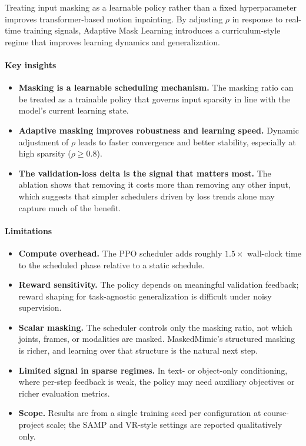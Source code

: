 \documentclass[10pt,letterpaper]{article}
\begin{document}
Treating input masking as a learnable policy rather than a fixed hyperparameter improves transformer-based motion inpainting. By adjusting $\rho$ in response to real-time training signals, Adaptive Mask Learning introduces a curriculum-style regime that improves learning dynamics and generalization.

\paragraph{Key insights}
\begin{itemize}
  \item \textbf{Masking is a learnable scheduling mechanism.} The masking ratio can be treated as a trainable policy that governs input sparsity in line with the model's current learning state.
  \item \textbf{Adaptive masking improves robustness and learning speed.} Dynamic adjustment of $\rho$ leads to faster convergence and better stability, especially at high sparsity ($\rho \ge 0.8$).
  \item \textbf{The validation-loss delta is the signal that matters most.} The ablation shows that removing it costs more than removing any other input, which suggests that simpler schedulers driven by loss trends alone may capture much of the benefit.
\end{itemize}

\paragraph{Limitations}
\begin{itemize}
  \item \textbf{Compute overhead.} The PPO scheduler adds roughly $1.5\times$ wall-clock time to the scheduled phase relative to a static schedule.
  \item \textbf{Reward sensitivity.} The policy depends on meaningful validation feedback; reward shaping for task-agnostic generalization is difficult under noisy supervision.
  \item \textbf{Scalar masking.} The scheduler controls only the masking ratio, not which joints, frames, or modalities are masked. MaskedMimic's structured masking is richer, and learning over that structure is the natural next step.
  \item \textbf{Limited signal in sparse regimes.} In text- or object-only conditioning, where per-step feedback is weak, the policy may need auxiliary objectives or richer evaluation metrics.
  \item \textbf{Scope.} Results are from a single training seed per configuration at course-project scale; the SAMP and VR-style settings are reported qualitatively only.
\end{itemize}
\end{document}
